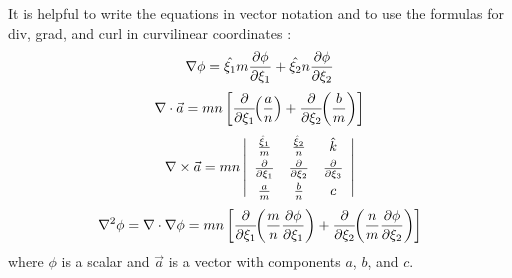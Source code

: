 It is helpful to write the equations in vector notation and to use
the formulas for div, grad, and curl in curvilinear coordinates
\citep[see][Appendix 2]{Batchelor}:
\begin{equation}
   \nabla \phi = \hat{\xi_1} m {\partial \phi \over \partial \xi_1} +
                 \hat{\xi_2} n {\partial \phi \over \partial \xi_2}
\end{equation}
\begin{equation}
   \nabla \cdot \vec{a} = mn \left[
   {\partial \over \partial \xi_1} \!\! \left( {a \over n} \right) +
   {\partial \over \partial \xi_2} \!\! \left( {b \over m} \right)
   \right]
\end{equation}
\begin{equation}
   \nabla \times \vec{a} = mn \left| \begin{array}{ccc}
   \vspace{1 mm}
   {\hat{\xi}_1 \over m} & {\hat{\xi}_2 \over n} & \hat{k} \\
   \vspace{1 mm}
   {\partial \over \partial \xi_1} &
   {\partial \over \partial \xi_2} &
   {\partial \over \partial \xi_3} \\
   {a \over m} & {b \over n} & c
   \end{array} \right|
\end{equation}
\begin{equation}
   \nabla^2 \phi = \nabla \cdot \nabla \phi = mn \left[ 
   {\partial \over \partial \xi_1} \!\! \left( {m \over n} 
   {\partial \phi \over \partial \xi_1} \right) +
   {\partial \over \partial \xi_2} \!\! \left( {n \over m} 
   {\partial \phi \over \partial \xi_2} \right) \right]
\end{equation}
where $\phi$ is a scalar and $\vec{a}$ is a vector with components
$a$, $b$, and $c$.


